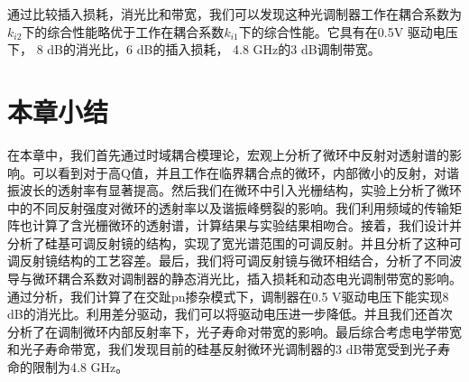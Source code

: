 通过比较插入损耗，消光比和带宽，我们可以发现这种光调制器工作在耦合系数为$k_{i2}$下的综合性能略优于工作在耦合系数$k_{i1}$下的综合性能。它具有在0.5V 驱动电压下， 8 dB的消光比，6 dB的插入损耗， 4.8 GHz的3 dB调制带宽。

\section{本章小结}
在本章中，我们首先通过时域耦合模理论，宏观上分析了微环中反射对透射谱的影响。可以看到对于高Q值，并且工作在临界耦合点的微环，内部微小的反射，对谐振波长的透射率有显著提高。然后我们在微环中引入光栅结构，实验上分析了微环中的不同反射强度对微环的透射率以及谐振峰劈裂的影响。我们利用频域的传输矩阵也计算了含光栅微环的透射谱，计算结果与实验结果相吻合。接着，我们设计并分析了硅基可调反射镜的结构，实现了宽光谱范围的可调反射。并且分析了这种可调反射镜结构的工艺容差。最后，我们将可调反射镜与微环相结合，分析了不同波导与微环耦合系数对调制器的静态消光比，插入损耗和动态电光调制带宽的影响。通过分析，我们计算了在交趾pn掺杂模式下，调制器在0.5 V驱动电压下能实现8 dB的消光比。利用差分驱动，我们可以将驱动电压进一步降低。并且我们还首次分析了在调制微环内部反射率下，光子寿命对带宽的影响。最后综合考虑电学带宽和光子寿命带宽，我们发现目前的硅基反射微环光调制器的3 dB带宽受到光子寿命的限制为4.8 GHz。

